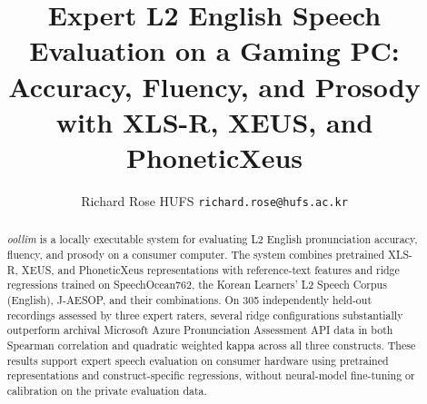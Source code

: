 \documentclass[10pt]{article}
\title{\Large Expert L2 English Speech Evaluation on a Gaming PC:\\[3pt]\large Accuracy, Fluency, and Prosody with XLS-R, XEUS, and PhoneticXeus}
\author{Richard Rose \enspace\textbar\enspace HUFS \enspace\textbar\enspace \texttt{richard.rose@hufs.ac.kr}}
\date{}
\begin{document}
\maketitle
\begin{abstract}
\textit{oollim} is a locally executable system for evaluating L2 English pronunciation accuracy, fluency, and prosody on a consumer computer. The system combines pretrained XLS-R, XEUS, and PhoneticXeus representations with reference-text features and ridge regressions trained on SpeechOcean762, the Korean Learners' L2 Speech Corpus (English), J-AESOP, and their combinations. On 305 independently held-out recordings assessed by three expert raters, several ridge configurations substantially outperform archival Microsoft Azure Pronunciation Assessment API data in both Spearman correlation and quadratic weighted kappa across all three constructs. These results support expert speech evaluation on consumer hardware using pretrained representations and construct-specific regressions, without neural-model fine-tuning or calibration on the private evaluation data.
\end{abstract}
\end{document}
